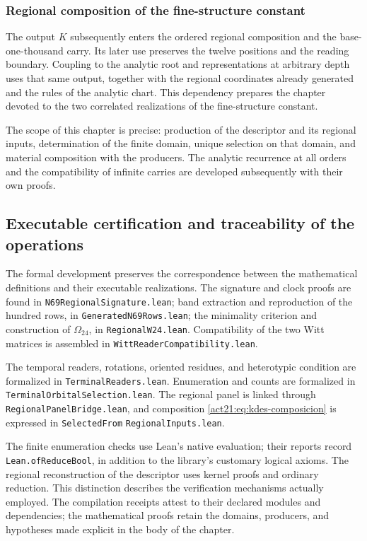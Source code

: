 \subsubsection{Regional composition of the fine-structure constant}

The output $K$ subsequently enters the ordered regional
composition and the base-one-thousand carry. Its later use preserves the
twelve positions and the reading boundary. Coupling to the analytic
root and representations at arbitrary depth uses that
same output, together with the regional coordinates already generated and the
rules of the analytic chart. This dependency prepares the chapter
devoted to the two correlated realizations of the fine-structure
constant.

The scope of this chapter is precise: production of the descriptor and
its regional inputs, determination of the finite domain,
unique selection on that domain, and material composition with the
producers. The analytic recurrence at all orders and the
compatibility of infinite carries are developed subsequently with their
own proofs.

\subsection{Executable certification and traceability of the operations}

The formal development preserves the correspondence between the
mathematical definitions and their executable realizations. The signature
and clock proofs are found in
\texttt{N69RegionalSignature.lean}; band extraction and
reproduction of the hundred rows, in
\texttt{GeneratedN69Rows.lean}; the minimality criterion and construction
of $\Omega_{24}$, in \texttt{RegionalW24.lean}. Compatibility of
the two Witt matrices is assembled in
\texttt{WittReaderCompatibility.lean}.

The temporal readers, rotations, oriented residues, and
heterotypic condition are formalized in
\texttt{TerminalReaders.lean}. Enumeration and counts are
formalized in \texttt{Terminal}\allowbreak\texttt{Orbital}\allowbreak\texttt{Selection.lean}. The regional
panel is linked through \texttt{Regional}\allowbreak\texttt{Panel}\allowbreak\texttt{Bridge.lean}, and
composition \eqref{act21:eq:kdes-composicion} is expressed in
\texttt{Selected}\allowbreak\texttt{From}\allowbreak%
\texttt{Regional}\allowbreak\texttt{Inputs.lean}.

The finite enumeration checks use Lean's native
evaluation; their reports record \texttt{Lean.ofReduceBool}, in addition
to the library's customary logical axioms. The regional reconstruction
of the descriptor uses kernel proofs and ordinary
reduction. This distinction describes the verification mechanisms
actually employed. The compilation receipts attest to their declared modules
and dependencies; the mathematical proofs retain the
domains, producers, and hypotheses made explicit in the body
of the chapter.
